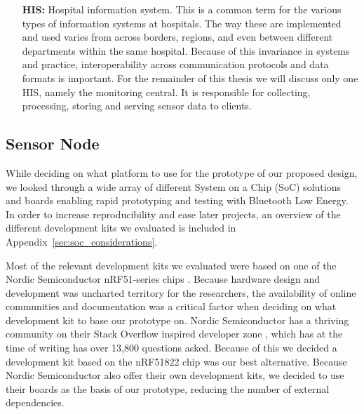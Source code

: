 \begin{itemize}
  \item[\textbf{HIS:}] Hospital information system. This is a common term for the various types of information systems at hospitals. The way these are implemented and used varies from across borders, regions, and even between different departments within the same hospital. Because of this invariance in systems and practice, interoperability across communication protocols and data formats is important. For the remainder of this thesis we will discuss only one HIS, namely the monitoring central. It is responsible for collecting, processing, storing and serving sensor data to clients.

\end{itemize}



\subsection{Sensor Node} %
\label{sub:node}

While deciding on what platform to use for the prototype of our proposed design, we looked through a wide array of different System on a Chip (SoC) solutions and boards enabling rapid prototyping and testing with Bluetooth Low Energy. In order to increase reproducibility and ease later projects, an overview of the different development kits we evaluated is included in Appendix~\ref{sec:soc_considerations}.

Most of the relevant development kits we evaluated were based on one of the Nordic Semiconductor nRF51-series chips \cite{newRef:36, newRef:36:2}. Because hardware design and development was uncharted territory for the researchers, the availability of online communities and documentation was a critical factor when deciding on what development kit to base our prototype on. Nordic Semiconductor has a thriving community on their Stack Overflow inspired developer zone \cite{newRef:50}, which has at the time of writing has over 13,800 questions asked. Because of this we decided a development kit based on the nRF51822 chip was our best alternative. Because Nordic Semiconductor also offer their own development kits, we decided to use their boards as the basis of our prototype, reducing the number of external dependencies.

